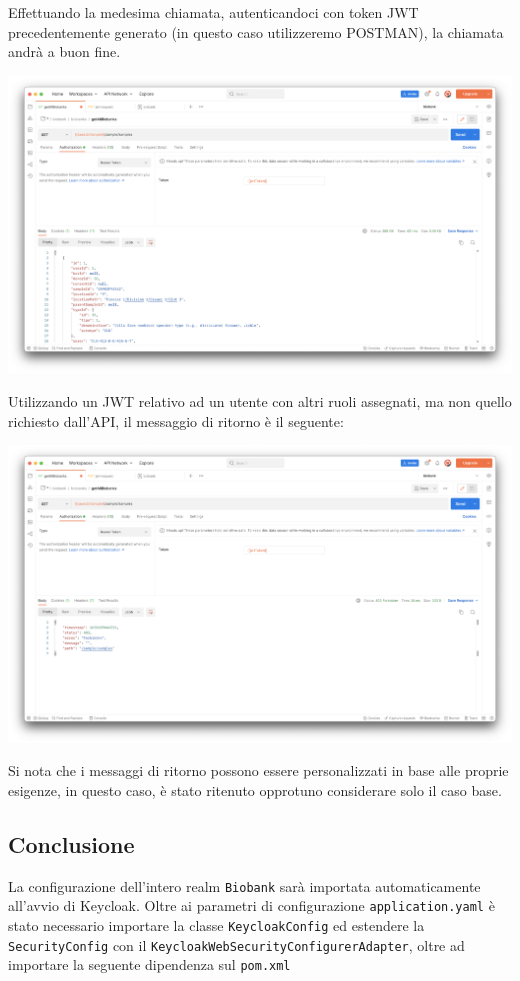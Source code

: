 \documentclass{article}
\begin{document}
Effettuando la medesima chiamata, autenticandoci con token JWT precedentemente generato (in questo caso utilizzeremo POSTMAN), la chiamata andrà a buon fine.

\begin{center}
    \includegraphics[width=0.80\linewidth]{keycloak_18.png}
\end{center}

Utilizzando un JWT relativo ad un utente con altri ruoli assegnati, ma non quello richiesto dall'API, il messaggio di ritorno è il seguente:

\begin{center}
    \includegraphics[width=0.80\linewidth]{keycloak_19.png}
\end{center}

Si nota che i messaggi di ritorno possono essere personalizzati in base alle proprie esigenze, in questo caso, è stato ritenuto opprotuno considerare solo il caso base.

\subsection{Conclusione}

La configurazione dell'intero realm \texttt{Biobank} sarà importata automaticamente all'avvio di Keycloak. Oltre ai parametri di configurazione \texttt{application.yaml} è stato necessario importare la classe
\texttt{KeycloakConfig} ed estendere la \texttt{SecurityConfig} con il \texttt{KeycloakWebSecurityConfigurerAdapter}, oltre ad importare la seguente dipendenza sul \texttt{pom.xml}
\end{document}
